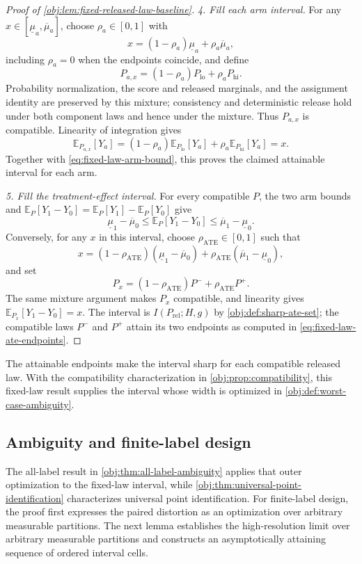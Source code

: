 \documentclass[11pt]{article}
\begin{document}
\begin{proof}[Proof of \cref{obj:lem:fixed-released-law-baseline}]
\noindent\emph{4. Fill each arm interval.}
For any \(x\in[\underline\mu_a,\overline\mu_a]\), choose \(\rho_a\in[0,1]\) with
\[
x=(1-\rho_a)\underline\mu_a+\rho_a\overline\mu_a,
\]
including \(\rho_a=0\) when the endpoints coincide, and define
\[
P_{a,x}=(1-\rho_a)P_{\mathrm{lo}}+\rho_aP_{\mathrm{hi}}.
\]
Probability normalization, the score and released marginals, and the assignment identity are preserved by this mixture; consistency and deterministic release hold under both component laws and hence under the mixture. Thus \(P_{a,x}\) is compatible. Linearity of integration gives
\[
\mathbb E_{P_{a,x}}[Y_a]
=(1-\rho_a)\mathbb E_{P_{\mathrm{lo}}}[Y_a]
+\rho_a\mathbb E_{P_{\mathrm{hi}}}[Y_a]=x.
\]
Together with \cref{eq:fixed-law-arm-bound}, this proves the claimed attainable interval for each arm. %

\noindent\emph{5. Fill the treatment-effect interval.}
For every compatible \(P\), the two arm bounds and
\(\mathbb E_P[Y_1-Y_0]=\mathbb E_P[Y_1]-\mathbb E_P[Y_0]\) give
\[
\underline\mu_1-\overline\mu_0
\le\mathbb E_P[Y_1-Y_0]
\le\overline\mu_1-\underline\mu_0.
\]
Conversely, for any \(x\) in this interval, choose \(\rho_{\mathrm{ATE}}\in[0,1]\) such that
\[
x=(1-\rho_{\mathrm{ATE}})(\underline\mu_1-\overline\mu_0)
+\rho_{\mathrm{ATE}}(\overline\mu_1-\underline\mu_0),
\]
and set
\[
P_x=(1-\rho_{\mathrm{ATE}})P^-+\rho_{\mathrm{ATE}}P^+.
\]
The same mixture argument makes \(P_x\) compatible, and linearity gives
\(\mathbb E_{P_x}[Y_1-Y_0]=x\). The interval is \(I(P_{\mathrm{rel}};H,g)\) by \cref{obj:def:sharp-ate-set}; the compatible laws \(P^-\) and \(P^+\) attain its two endpoints as computed in \cref{eq:fixed-law-ate-endpoints}. %
\end{proof}

The attainable endpoints make the interval sharp for each compatible released law. With the compatibility characterization in \cref{obj:prop:compatibility}, this fixed-law result supplies the interval whose width is optimized in \cref{obj:def:worst-case-ambiguity}.

\subsection{Ambiguity and finite-label design}

The all-label result in \cref{obj:thm:all-label-ambiguity} applies that outer optimization to the fixed-law interval, while \cref{obj:thm:universal-point-identification} characterizes universal point identification. For finite-label design, the proof first expresses the paired distortion as an optimization over arbitrary measurable partitions. The next lemma establishes the high-resolution limit over arbitrary measurable partitions and constructs an asymptotically attaining sequence of ordered interval cells.
\end{document}
